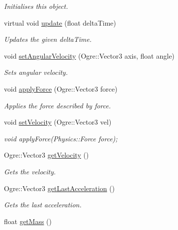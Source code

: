 \begin{DoxyCompactItemize}
\begin{DoxyCompactList}\small\item\em Initialises this object. \end{DoxyCompactList}\item 
virtual void \hyperlink{class_objects_1_1_rigid_body_object_a478edcbc5820722a9641fdcd07b402bb}{update} (float delta\-Time)
\begin{DoxyCompactList}\small\item\em Updates the given delta\-Time. \end{DoxyCompactList}\item 
void \hyperlink{class_objects_1_1_rigid_body_object_a4962caad85c4a7c19039ca937079daa1}{set\-Angular\-Velocity} (Ogre\-::\-Vector3 axis, float angle)
\begin{DoxyCompactList}\small\item\em Sets angular velocity. \end{DoxyCompactList}\item 
void \hyperlink{class_objects_1_1_rigid_body_object_a721c1dc9a881fab6db36f60edb715fbd}{apply\-Force} (Ogre\-::\-Vector3 force)
\begin{DoxyCompactList}\small\item\em Applies the force described by force. \end{DoxyCompactList}\item 
void \hyperlink{class_objects_1_1_rigid_body_object_afae0c2363af38e3c691d37204a489505}{set\-Velocity} (Ogre\-::\-Vector3 vel)
\begin{DoxyCompactList}\small\item\em void apply\-Force(\-Physics\-::\-Force force); \end{DoxyCompactList}\item 
Ogre\-::\-Vector3 \hyperlink{class_objects_1_1_rigid_body_object_a722575b42384d8d7be5f123ae8ecc21c}{get\-Velocity} ()
\begin{DoxyCompactList}\small\item\em Gets the velocity. \end{DoxyCompactList}\item 
Ogre\-::\-Vector3 \hyperlink{class_objects_1_1_rigid_body_object_ac6056bc9cf0fa789e46c66bbc3c465c3}{get\-Last\-Acceleration} ()
\begin{DoxyCompactList}\small\item\em Gets the last acceleration. \end{DoxyCompactList}\item 
float \hyperlink{class_objects_1_1_rigid_body_object_a9195f7e6e5854c894e1b0e4643f39340}{get\-Mass} ()

\end{DoxyCompactItemize}

